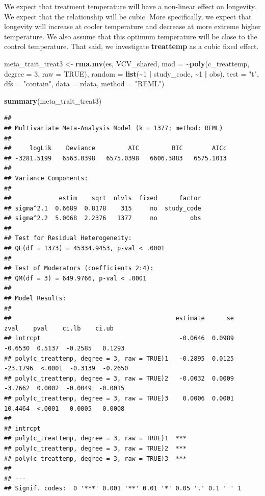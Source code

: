 \documentclass[
]{article}
\newenvironment{Shaded}{\begin{snugshade}}{\end{snugshade}}
\newcommand{\AttributeTok}[1]{\textcolor[rgb]{0.13,0.29,0.53}{#1}}
\newcommand{\ConstantTok}[1]{\textcolor[rgb]{0.56,0.35,0.01}{#1}}
\newcommand{\DecValTok}[1]{\textcolor[rgb]{0.00,0.00,0.81}{#1}}
\newcommand{\FunctionTok}[1]{\textcolor[rgb]{0.13,0.29,0.53}{\textbf{#1}}}
\newcommand{\NormalTok}[1]{#1}
\newcommand{\OtherTok}[1]{\textcolor[rgb]{0.56,0.35,0.01}{#1}}
\newcommand{\SpecialCharTok}[1]{\textcolor[rgb]{0.81,0.36,0.00}{\textbf{#1}}}
\newcommand{\StringTok}[1]{\textcolor[rgb]{0.31,0.60,0.02}{#1}}
\begin{document}
We expect that treatment temperature will have a non-linear effect on
longevity. We expect that the relationship will be cubic. More
specifically, we expect that longevity will increase at cooler
temperature and decrease at more extreme higher temperature. We also
assume that this optimum temperature will be close to the control
temperature. That said, we investigate \textbf{treattemp} as a cubic
fixed effect.

\begin{Shaded}
\begin{Highlighting}[]
\NormalTok{meta\_trait\_treat3 }\OtherTok{\textless{}{-}} \FunctionTok{rma.mv}\NormalTok{(es, VCV\_shared, }\AttributeTok{mod =} \SpecialCharTok{\textasciitilde{}}\FunctionTok{poly}\NormalTok{(c\_treattemp,}
    \AttributeTok{degree =} \DecValTok{3}\NormalTok{, }\AttributeTok{raw =} \ConstantTok{TRUE}\NormalTok{), }\AttributeTok{random =} \FunctionTok{list}\NormalTok{(}\SpecialCharTok{\textasciitilde{}}\DecValTok{1} \SpecialCharTok{|}\NormalTok{ study\_code, }\SpecialCharTok{\textasciitilde{}}\DecValTok{1} \SpecialCharTok{|}
\NormalTok{    obs), }\AttributeTok{test =} \StringTok{"t"}\NormalTok{, }\AttributeTok{dfs =} \StringTok{"contain"}\NormalTok{, }\AttributeTok{data =}\NormalTok{ rdata, }\AttributeTok{method =} \StringTok{"REML"}\NormalTok{)}
\end{Highlighting}
\end{Shaded}

\begin{Shaded}
\begin{Highlighting}[]
\FunctionTok{summary}\NormalTok{(meta\_trait\_treat3)}
\end{Highlighting}
\end{Shaded}

\begin{verbatim}
## 
## Multivariate Meta-Analysis Model (k = 1377; method: REML)
## 
##     logLik    Deviance         AIC         BIC        AICc   
## -3281.5199   6563.0398   6575.0398   6606.3883   6575.1013   
## 
## Variance Components:
## 
##             estim    sqrt  nlvls  fixed      factor 
## sigma^2.1  0.6689  0.8178    315     no  study_code 
## sigma^2.2  5.0068  2.2376   1377     no         obs 
## 
## Test for Residual Heterogeneity:
## QE(df = 1373) = 45334.9453, p-val < .0001
## 
## Test of Moderators (coefficients 2:4):
## QM(df = 3) = 649.9766, p-val < .0001
## 
## Model Results:
## 
##                                             estimate      se      zval    pval    ci.lb    ci.ub 
## intrcpt                                      -0.0646  0.0989   -0.6530  0.5137  -0.2585   0.1293 
## poly(c_treattemp, degree = 3, raw = TRUE)1   -0.2895  0.0125  -23.1796  <.0001  -0.3139  -0.2650 
## poly(c_treattemp, degree = 3, raw = TRUE)2   -0.0032  0.0009   -3.7662  0.0002  -0.0049  -0.0015 
## poly(c_treattemp, degree = 3, raw = TRUE)3    0.0006  0.0001   10.4464  <.0001   0.0005   0.0008 
##                                                 
## intrcpt                                         
## poly(c_treattemp, degree = 3, raw = TRUE)1  *** 
## poly(c_treattemp, degree = 3, raw = TRUE)2  *** 
## poly(c_treattemp, degree = 3, raw = TRUE)3  *** 
## 
## ---
## Signif. codes:  0 '***' 0.001 '**' 0.01 '*' 0.05 '.' 0.1 ' ' 1
\end{verbatim}
\end{document}
